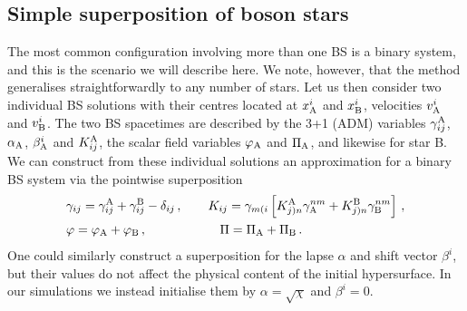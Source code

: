 \subsection{Simple superposition of boson stars}
%
\label{mal:sec:superpossimple}
The most common configuration involving more than one BS
is a binary system, and this is the scenario we will
describe here. We note, however, that the method
generalises straightforwardly to any number of stars.
Let us then consider two individual BS solutions
with their centres located at $x^i_{\rm A}$ and $x^i_{\rm B}$,
velocities $v_{\rm A}^i$ and $v_{\rm B}^i$.
The two BS spacetimes are
described by the 3+1 (ADM) variables $\gamma_{ij}^{\rm A}$,
$\alpha_{\rm A}$, $\beta_{\rm A}^i$ and $K_{ij}^{\rm A}$,
the scalar field variables $\varphi_{\rm A}$ and $\Pi_{\rm A}$,
and likewise for star B. We can construct from these
individual solutions an approximation for a binary BS system
via the pointwise superposition
%
\begin{align}
  &\gamma_{ij} =
  \gamma_{ij}^{\rm A}
  +\gamma_{ij}^{\rm B}
  -\delta_{ij}\,,~~~~~~
  K_{ij} = \gamma_{m(i}
  \left[
  K^{\rm A}_{j)n}
  \gamma_{\rm A}^{nm}
  +K^{\rm B}_{j)n}
  \gamma_{\rm B}^{nm}
  \right]\,,
  \nonumber \\
  &\varphi = \varphi_{\rm A} + \varphi_{\rm B}\,,
  \hspace{0.85cm}~~~~~~~~~~
  \Pi = \Pi_{\rm A} + \Pi_{\rm B}\,.
  \label{mal:eq:superpossimple}
\end{align}
%
One could similarly construct a superposition for the lapse
$\alpha$ and shift vector $\beta^i$, but their values do not
affect the physical content of the initial hypersurface.
In our simulations we instead initialise them by
$\alpha=\sqrt{\chi}$ and $\beta^i=0$.

